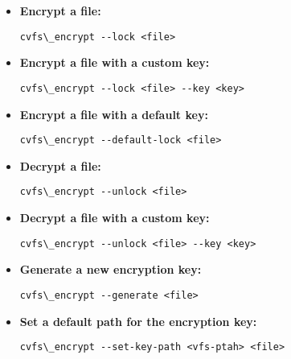 \begin{itemize}
    \setlength\itemsep{-0.1em}
    \item \textbf{Encrypt a file:} \\
    \begin{BVerbatim}[baseline=t,boxwidth=10cm]
  cvfs\_encrypt --lock <file>
    \end{BVerbatim}

    \item \textbf{Encrypt a file with a custom key:} \\
    \begin{BVerbatim}[baseline=t,boxwidth=10cm]
  cvfs\_encrypt --lock <file> --key <key>
    \end{BVerbatim}

    \item \textbf{Encrypt a file with a default key:} \\
    \begin{BVerbatim}[baseline=t,boxwidth=10cm]
  cvfs\_encrypt --default-lock <file>
    \end{BVerbatim}

    \item \textbf{Decrypt a file:} \\
    \begin{BVerbatim}[baseline=t,boxwidth=10cm]
  cvfs\_encrypt --unlock <file>
    \end{BVerbatim}

    \item \textbf{Decrypt a file with a custom key:} \\
    \begin{BVerbatim}[baseline=t,boxwidth=10cm]
  cvfs\_encrypt --unlock <file> --key <key>
    \end{BVerbatim}

    \item \textbf{Generate a new encryption key:} \\
    \begin{BVerbatim}[baseline=t,boxwidth=10cm]
  cvfs\_encrypt --generate <file>
    \end{BVerbatim}

    \item \textbf{Set a default path for the encryption key:} \\
    \begin{BVerbatim}[baseline=t,boxwidth=10cm]
  cvfs\_encrypt --set-key-path <vfs-ptah> <file>
    \end{BVerbatim}
\end{itemize}

